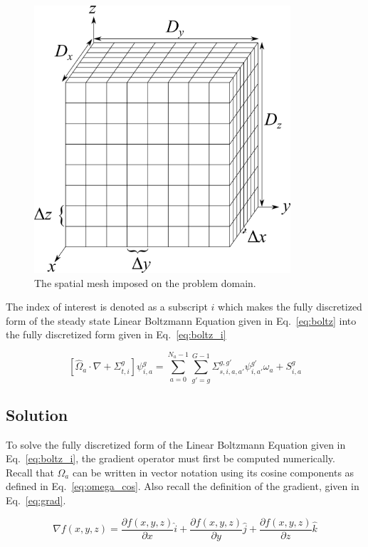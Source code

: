 \begin{figure}[tb]
  \begin{center}
   \includegraphics[width=3.75in]{figs/spatial_disc}
  \end{center}
  \caption{The spatial mesh imposed on the problem domain.}
\label{fig:spatial_disc}
\end{figure}

The index of interest is denoted as a subscript $i$ which makes the fully discretized form of the steady state Linear Boltzmann Equation given in Eq.~\ref{eq:boltz} into the fully discretized form given in Eq.~\ref{eq:boltz_i}

\begin{equation} \label{eq:boltz_i}
\left[ \hat{\Omega}_a \cdot \nabla + \Sigma_{t,i}^g \right]
\psi_{i,a}^{g} = 
\sum_{a=0}^{N_a-1} \sum_{g'=g}^{G-1} \Sigma_{s, i, a, a'}^{g, g'} \psi_{i, a'}^{g'} \omega_a + S_{i,a}^g
\end{equation}

\subsection{Solution}

To solve the fully discretized form of the Linear Boltzmann Equation given in Eq.~\ref{eq:boltz_i}, the gradient operator must first be computed numerically. Recall that $\Omega_a$ can be written in vector notation using its cosine components as defined in Eq.~\ref{eq:omega_cos}. Also recall the definition of the gradient, given in Eq.~\ref{eq:grad}.

\begin{equation} \label{eq:grad}
\nabla f(x, y, z) = \frac{\partial f(x, y, z)}{\partial x} \hat{i} + \frac{\partial f(x, y, z)}{\partial y} \hat{j} + \frac{\partial f(x, y, z)}{\partial z} \hat{k}
\end{equation}

